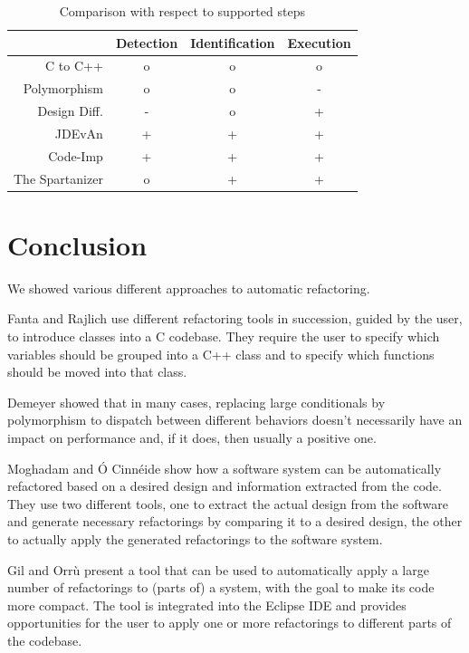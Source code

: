 \documentclass[conference,compsoc,a4paper]{IEEEtran}
\begin{document}
\begin{table}[htb]
  \centering
  \caption{Comparison with respect to supported steps}
  \label{tbl:steps}
  \begin{tabular}{r|ccc}
    ~               & Detection & Identification  & Execution \\ \hline
    C to C++        & o         & o               & o \\
    Polymorphism    & o         & o               & - \\
    Design Diff.    & -         & o               & + \\
    JDEvAn          & +         & +               & + \\
    Code-Imp        & +         & +               & + \\
    The Spartanizer & o         & +               & + \\
  \end{tabular}
\end{table}

\section{Conclusion}

We showed various different approaches to automatic refactoring.

Fanta and Rajlich \cite{cpp} use different refactoring tools in succession, guided by the user, to introduce classes 
into a C codebase. They require the user to specify which variables should be grouped into a C++ class and to specify 
which functions should be moved into that class.

Demeyer \cite{polymorphism} showed that in many cases, replacing large conditionals by polymorphism to dispatch between 
different behaviors doesn't necessarily have an impact on performance and, if it does, then usually a positive one.

Moghadam and Ó Cinnéide \cite{design-diff} show how a software system can be automatically refactored based on a 
desired design and information extracted from the code. They use two different tools, one to extract the actual design 
from the software and generate necessary refactorings by comparing it to a desired design, the other to actually apply 
the generated refactorings to the software system.

Gil and Orrù \cite{sparta} present a tool that can be used to automatically apply a large number of refactorings to 
(parts of) a system, with the goal to make its code more compact. The tool is integrated into the Eclipse IDE and 
provides opportunities for the user to apply one  or more refactorings to different parts of the codebase.
\end{document}
